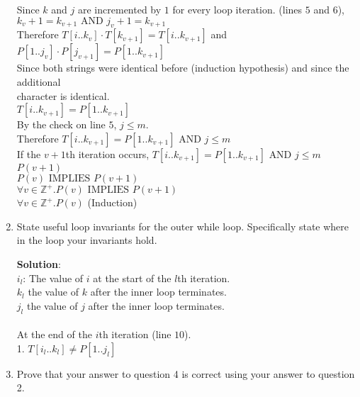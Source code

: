 \documentclass[11pt]{article}
\def\ints {{\mathbb Z}}
\newcommand{\Implies}{\mbox{ IMPLIES }}
\newcommand{\And}{\mbox{ AND }}
\begin{document}
\begin{enumerate}
\begin{solution}
\null\qquad\quad Since $k$ and $j$ are incremented by $1$ for every loop iteration. (lines $5$ and $6$), \\
\null\qquad\quad $k_v + 1  =k_{v+1}\And j_v + 1 = k_{v+1}$\\
\null\qquad\quad Therefore $T[i..k_v] \cdot T[k_{v+1}] = T[i..k_{v+1}]$ and $P[1..j_v] \cdot P[j_{v+1}] = P[1..k_{v+1}]$\\
\null\qquad\quad Since both strings were identical before (induction hypothesis) and since the additional\\
\null\qquad\quad character is identical.\\
\null\qquad\quad $T[i..k_{v+1}] = P[1..k_{v+1}]$\\
\null\qquad\quad By the check on line $5$, $j\le m$.\\
\null\qquad\quad Therefore $T[i..k_{v+1}] = P[1..k_{v+1}]\And j\le m$\\
\null\qquad If the $v+1$th iteration occurs, $T[i..k_{v+1}] = P[1..k_{v+1}]\And j\le m$\\
\null\qquad $P(v+1)$\\
\null\quad $P(v)\Implies P(v+1)$\\
$\forall v\in\ints^+.P(v)\Implies P(v+1)$\\
$\forall v\in\ints^+.P(v)$ (Induction)
\end{solution}

\item
\begin{question}
State useful loop invariants for the outer while loop.
Specifically state where in the loop your invariants hold.
\end{question}

\begin{solution}
{\bf Solution}:\\
$i_l$: The value of $i$ at the start of the $l$th iteration.\\
$k_l$ the value of $k$ after the inner loop terminates.\\
$j_l$ the value of $j$ after the inner loop terminates.\\\\
At the end of the $i$th iteration (line $10$).\\
1. $T[i_l..k_l] \ne P[1..j_l] $
\end{solution}

\item
\begin{question}
Prove that your answer to question 4 is correct using your answer to question 2.
\end{question}


\end{enumerate}
\end{document}
